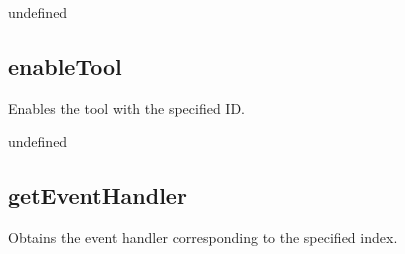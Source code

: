 \documentclass[letterpaper,12pt,english,openany,oneside]{sphinxmanual}
\begin{document}
\label{\detokenize{JS_3D_API:syntax-84}}

\begin{sphinxVerbatim}[commandchars=\\\{\}]
\end{sphinxVerbatim}
\label{\detokenize{JS_3D_API:parameters-62}}

\label{\detokenize{JS_3D_API:section-90}}\label{\detokenize{JS_3D_API:returns-85}}

undefined


\subsection{enableTool}
\label{\detokenize{JS_3D_API:enabletool}}
Enables the tool with the specified ID.

\label{\detokenize{JS_3D_API:syntax-85}}

\begin{sphinxVerbatim}[commandchars=\\\{\}]
\end{sphinxVerbatim}
\label{\detokenize{JS_3D_API:parameters-63}}

\label{\detokenize{JS_3D_API:section-91}}\label{\detokenize{JS_3D_API:returns-86}}

undefined


\subsection{getEventHandler}
\label{\detokenize{JS_3D_API:geteventhandler}}
Obtains the event handler corresponding to the specified index.

\label{\detokenize{JS_3D_API:syntax-86}}

\begin{sphinxVerbatim}[commandchars=\\\{\}]
\end{sphinxVerbatim}
\label{\detokenize{JS_3D_API:parameters-64}}
\end{document}

